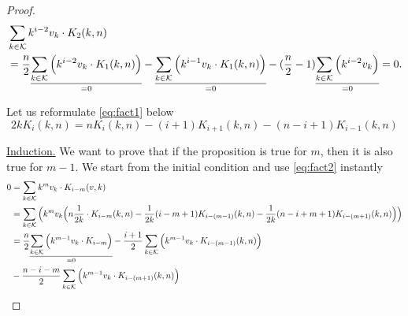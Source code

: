 \begin{proof}
    \begin{equation*}
    \begin{split}
        &\sum_{k \in \mathcal{K}} k^{i-2}v_k \cdot K_{2}(k, n)\\
        &= \frac{n}{2}\underset{=0}{\underline{\sum_{k \in \mathcal{K}} \Big( k^{i-2}v_k \cdot K_1(k, n) \Big)}} - \underset{=0}{\underline{\sum_{k \in \mathcal{K}} \Big( k^{i-1}v_k \cdot K_1(k,n) \Big)}} - (\frac{n}{2}-1)\underset{=0}{\underline{\sum_{k \in \mathcal{K}} \Big( k^{i-2}v_k \Big)}} = 0.
    \end{split}
    \end{equation*}

    Let us reformulate \cref{eq:fact1} below
    \begin{equation}\label{eq:fact2}
        2kK_i(k, n) = nK_i(k, n) - (i+1)K_{i+1}(k, n) - (n - i + 1)K_{i-1}(k, n)
    \end{equation}

    \underline{Induction.} We want to prove that if the proposition is true for $m$, then it is also true for $m -1$. We start from the initial condition and use \cref{eq:fact2} instantly
    \begin{equation*}
        \begin{split}
            0 &= \sum_{k \in \mathcal{K}}k^mv_k \cdot K_{i - m}(v, k)\\
            &= \sum_{k \in \mathcal{K}} \Big( k^mv_k \Big( n\frac{1}{2k} \cdot K_{i - m}(k, n) - \frac{1}{2k}(i - m + 1)K_{i - (m - 1)}(k,n) - \frac{1}{2k}(n- i + m + 1)K_{i-(m+1)}(k,n) \Big)\Big)\\
            &= \frac{n}{2} \underset{=0}{\underline{\sum_{k \in \mathcal{K}}\Big( k^{m-1}v_k \cdot K_{i-m}\Big)}} - \frac{i+1}{2}\sum_{k \in \mathcal{K}}\Big( k^{m-1}v_k \cdot K_{i-(m-1)}(k,n)\Big)\\ &- \frac{n - i - m}{2}\sum_{k \in \mathcal{K}} \Big( k^{m-1}v_k \cdot K_{i-(m+1)}(k,n) \Big)\\
        \end{split}
    \end{equation*}

\end{proof}


